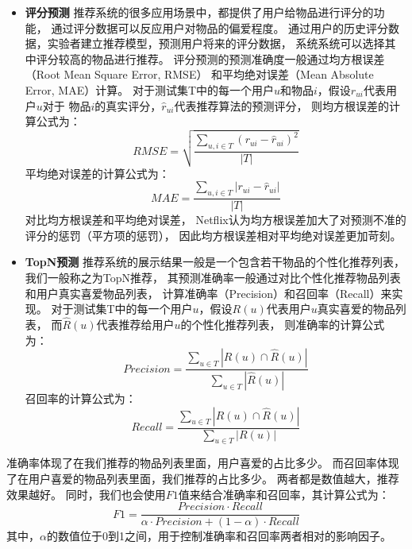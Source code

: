 \begin{itemize}
\item \textbf{评分预测}
推荐系统的很多应用场景中，都提供了用户给物品进行评分的功能，
通过评分数据可以反应用户对物品的偏爱程度。
通过用户的历史评分数据，实验者建立推荐模型，预测用户将来的评分数据，
系统系统可以选择其中评分较高的物品进行推荐。
评分预测的预测准确度一般通过均方根误差（Root Mean Square Error, RMSE）
和平均绝对误差（Mean Absolute Error, MAE）计算。
对于测试集T中的每一个用户$u$和物品$i$，假设$r_{ui}$代表用户$u$对于
物品$i$的真实评分，$\hat{r}_{ui}$代表推荐算法的预测评分，
则均方根误差的计算公式为：
\begin{equation}
RMSE = \sqrt{\frac{\sum_{u,i \in T}{(r_{ui} - \hat{r}_{ui})^2}}{|T|}}
\end{equation}
平均绝对误差的计算公式为：
\begin{equation}
MAE = \frac{\sum_{u,i \in T}{|r_{ui} - \hat{r}_{ui}|}}{|T|}
\end{equation}
对比均方根误差和平均绝对误差，
Netflix认为均方根误差加大了对预测不准的评分的惩罚（平方项的惩罚），
因此均方根误差相对平均绝对误差更加苛刻。

\item \textbf{TopN预测}
推荐系统的展示结果一般是一个包含若干物品的个性化推荐列表，我们一般称之为TopN推荐，
其预测准确率一般通过对比个性化推荐物品列表和用户真实喜爱物品列表，
计算准确率（Precision）和召回率（Recall）来实现。
对于测试集T中的每一个用户$u$，假设$R(u)$代表用户$u$真实喜爱的物品列表，
而$\hat{R}(u)$代表推荐给用户$u$的个性化推荐列表，
则准确率的计算公式为：
\begin{equation}
Precision = \frac{ \sum_{u \in T}{|R(u) \cap \hat{R}(u)|} }{ \sum_{u \in T}{|\hat{R}(u)|} }
\end{equation}
召回率的计算公式为：
\begin{equation}
Recall = \frac{ \sum_{u \in T}{|R(u) \cap \hat{R}(u)|} }{ \sum_{u \in T}{|R(u)|} }
\end{equation}
\end{itemize}
准确率体现了在我们推荐的物品列表里面，用户喜爱的占比多少。
而召回率体现了在用户喜爱的物品列表里面，我们推荐的占比多少。
两者都是数值越大，推荐效果越好。
同时，我们也会使用$F1$值来结合准确率和召回率，其计算公式为：
\begin{equation}
F1 = \frac{Precision \cdot Recall}{ \alpha \cdot Precision + (1 - \alpha) \cdot Recall }
\end{equation}
其中，$\alpha$的数值位于0到1之间，用于控制准确率和召回率两者相对的影响因子。

